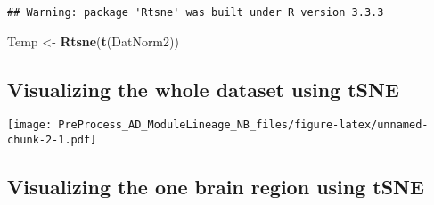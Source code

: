\documentclass[]{article}
\newenvironment{Shaded}{\begin{snugshade}}{\end{snugshade}}
\newcommand{\KeywordTok}[1]{\textcolor[rgb]{0.13,0.29,0.53}{\textbf{#1}}}
\newcommand{\DataTypeTok}[1]{\textcolor[rgb]{0.13,0.29,0.53}{#1}}
\newcommand{\DecValTok}[1]{\textcolor[rgb]{0.00,0.00,0.81}{#1}}
\newcommand{\StringTok}[1]{\textcolor[rgb]{0.31,0.60,0.02}{#1}}
\newcommand{\CommentTok}[1]{\textcolor[rgb]{0.56,0.35,0.01}{\textit{#1}}}
\newcommand{\OperatorTok}[1]{\textcolor[rgb]{0.81,0.36,0.00}{\textbf{#1}}}
\newcommand{\NormalTok}[1]{#1}
\begin{document}
\begin{verbatim}
## Warning: package 'Rtsne' was built under R version 3.3.3
\end{verbatim}

\begin{Shaded}
\begin{Highlighting}[]
\NormalTok{Temp <-}\StringTok{ }\KeywordTok{Rtsne}\NormalTok{(}\KeywordTok{t}\NormalTok{(DatNorm2))}
\end{Highlighting}
\end{Shaded}

\subsection{Visualizing the whole dataset using
tSNE}\label{visualizing-the-whole-dataset-using-tsne}

\begin{Shaded}
\end{Shaded}

\texttt{[image: PreProcess\_AD\_ModuleLineage\_NB\_files/figure-latex/unnamed-chunk-2-1.pdf]}

\subsection{Visualizing the one brain region using
tSNE}\label{visualizing-the-one-brain-region-using-tsne}

\begin{Shaded}
\end{Shaded}
\end{document}
